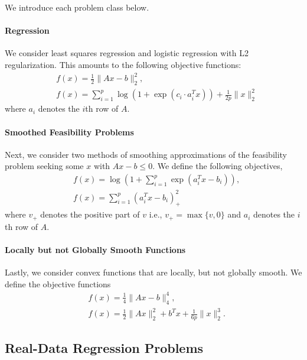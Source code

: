 \documentclass[11pt]{article}
\numberwithin{equation}{section}
\theoremstyle{definition}
\theoremstyle{plain}
\theoremstyle{definition}
\begin{document}
We introduce each problem class below.

\paragraph{Regression}
We consider least squares regression and logistic regression with L2 regularization. This amounts to the following objective functions:
\begin{align}
    & f(x) = \frac{1}{2}\|Ax-b\|_2^2 \label{Eqn:Objective_LSReg}, \\
    & f(x) = \sum_{i=1}^p \log(1+\exp(c_i \cdot a_i^T x ) ) + \frac{1}{2p}\|x\|_2^2 \label{Eqn:Objective_LogReg}
\end{align}
where $a_i$ denotes the $i$th row of $A$.


\paragraph{Smoothed Feasibility Problems}
Next, we consider two methods of smoothing approximations of the feasibility problem seeking some $x$ with $A x - b \leq 0$. We define the following objectives,
\begin{align}
    & f(x) = \log \left( 1+ \sum_{i=1}^p \exp(a_i^Tx - b_i) \right), \label{Eqn:Objective_LogSumExp}\\
    & f(x) = \sum_{i=1}^p (a_i^T x - b_i)_+^2 \label{Eqn:Objective_PosSquared}
\end{align}
where $v_+$ denotes the positive part of $v$ i.e., $v_+ = \max\{v, 0\}$ and $a_i$ denotes the $i$th row of $A$.

\paragraph{Locally but not Globally Smooth Functions}

Lastly, we consider convex functions that are locally, but not globally smooth. We define the objective functions
\begin{align}
    & f(x) = \frac{1}{4}\|Ax-b\|_4^4, \label{Eqn:Objective_4Norm}\\
    & f(x) = \frac{1}{2}\|A x\|_2^2 + b^T x + \frac{1}{6p}\|x\|_2^3. \label{Eqn:Objective_CubicReg}
\end{align}

\subsection{Real-Data Regression Problems} \label{SubSec:RealRegression}
\end{document}
